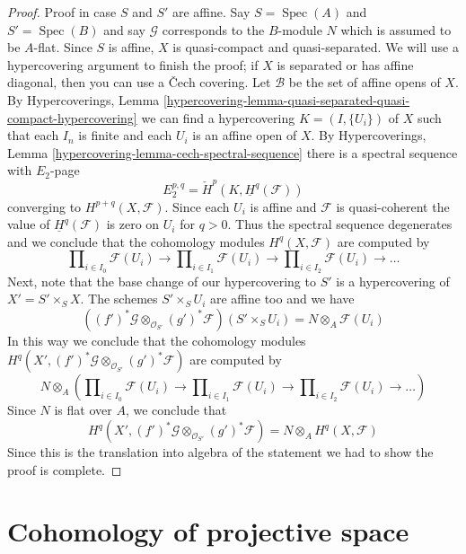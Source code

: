\documentclass{stacks-project}
\theoremstyle{plain}
\theoremstyle{definition}
\theoremstyle{remark}
\numberwithin{equation}{subsection}
\def\Spec{\mathop{\mathrm{Spec}}}
\begin{document}
\begin{proof}
\medskip\noindent
Proof in case $S$ and $S'$ are affine. Say $S = \Spec(A)$ and $S' = \Spec(B)$
and say $\mathcal{G}$ corresponds to the $B$-module $N$ which is assumed to be
$A$-flat. Since $S$ is affine, $X$ is quasi-compact and quasi-separated.
We will use a hypercovering argument to finish the proof; if $X$ is separated
or has affine diagonal, then you can use a {\v C}ech covering.
Let $\mathcal{B}$ be the set of affine opens of $X$. By
Hypercoverings,
Lemma \ref{hypercovering-lemma-quasi-separated-quasi-compact-hypercovering}
we can find a hypercovering $K = (I, \{U_i\})$ of $X$ such that each
$I_n$ is finite and each $U_i$ is an affine open of $X$. By
Hypercoverings, Lemma \ref{hypercovering-lemma-cech-spectral-sequence}
there is a spectral sequence with $E_2$-page
$$
E_2^{p, q} = \check{H}^p(K, \underline{H}^q(\mathcal{F}))
$$
converging to $H^{p + q}(X, \mathcal{F})$. Since each $U_i$ is affine
and $\mathcal{F}$ is quasi-coherent the value of
$\underline{H}^q(\mathcal{F})$ is zero on $U_i$ for $q > 0$. Thus the
spectral sequence degenerates and we conclude that the cohomology
modules $H^q(X, \mathcal{F})$ are computed by
$$
\prod\nolimits_{i \in I_0} \mathcal{F}(U_i)
\to
\prod\nolimits_{i \in I_1} \mathcal{F}(U_i)
\to
\prod\nolimits_{i \in I_2} \mathcal{F}(U_i)
\to \ldots
$$
Next, note that the base change of our hypercovering to
$S'$ is a hypercovering of $X' = S' \times_S X$.
The schemes $S' \times_S U_i$ are affine too
and we have
$$
\left((f')^*\mathcal{G} \otimes_{\mathcal{O}_{S'}} (g')^*\mathcal{F}\right)
(S' \times_S U_i) =
N \otimes_A \mathcal{F}(U_i)
$$
In this way we conclude that the cohomology modules
$H^q(X', (f')^*\mathcal{G} \otimes_{\mathcal{O}_{S'}} (g')^*\mathcal{F})$
are computed by
$$
N \otimes_A \left(
\prod\nolimits_{i \in I_0} \mathcal{F}(U_i)
\to
\prod\nolimits_{i \in I_1} \mathcal{F}(U_i)
\to
\prod\nolimits_{i \in I_2} \mathcal{F}(U_i)
\to \ldots
\right)
$$
Since $N$ is flat over $A$, we conclude that
$$
H^q(X', (f')^*\mathcal{G} \otimes_{\mathcal{O}_{S'}} (g')^*\mathcal{F})
=
N \otimes_A H^q(X, \mathcal{F})
$$
Since this is the translation into algebra of the statement
we had to show the proof is complete.
\end{proof}







\section{Cohomology of projective space}
\label{section-cohomology-projective-space}
\end{document}

